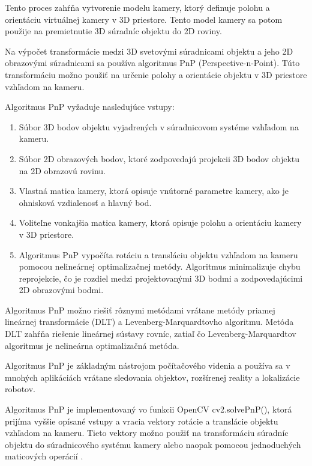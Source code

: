 {Tento proces zahŕňa vytvorenie modelu kamery, ktorý definuje polohu a orientáciu virtuálnej kamery v 3D priestore. Tento model kamery sa potom použije na premietnutie 3D súradníc objektu do 2D roviny.

Na výpočet transformácie medzi 3D svetovými súradnicami objektu a jeho 2D obrazovými súradnicami sa používa algoritmus PnP (Perspective-n-Point). Túto transformáciu možno použiť na určenie polohy a orientácie objektu v 3D priestore vzhľadom na kameru.

Algoritmus PnP vyžaduje nasledujúce vstupy:
\begin{enumerate}
\item Súbor 3D bodov objektu vyjadrených v súradnicovom systéme vzhľadom na kameru.
\item Súbor 2D obrazových bodov, ktoré zodpovedajú projekcii 3D bodov objektu na 2D obrazovú rovinu.
\item Vlastná matica kamery, ktorá opisuje vnútorné parametre kamery, ako je ohnisková vzdialenosť a hlavný bod.
\item Voliteľne vonkajšia matica kamery, ktorá opisuje polohu a orientáciu kamery v 3D priestore.
\item Algoritmus PnP vypočíta rotáciu a transláciu objektu vzhľadom na kameru pomocou nelineárnej optimalizačnej metódy. Algoritmus minimalizuje chybu reprojekcie, čo je rozdiel medzi projektovanými 3D bodmi a zodpovedajúcimi 2D obrazovými bodmi.
\end{enumerate}

Algoritmus PnP možno riešiť rôznymi metódami vrátane metódy priamej lineárnej transformácie (DLT) a Levenberg-Marquardtovho algoritmu. Metóda DLT zahŕňa riešenie lineárnej sústavy rovníc, zatiaľ čo Levenberg-Marquardtov algoritmus je nelineárna optimalizačná metóda.

Algoritmus PnP je základným nástrojom počítačového videnia a používa sa v mnohých aplikáciách vrátane sledovania objektov, rozšírenej reality a lokalizácie robotov.

Algoritmus PnP je implementovaný vo funkcii OpenCV cv2.solvePnP(), ktorá prijíma vyššie opísané vstupy a vracia vektory rotácie a translácie objektu vzhľadom na kameru. Tieto vektory možno použiť na transformáciu súradníc objektu do súradnicového systému kamery alebo naopak pomocou jednoduchých maticových operácií \citep{opencv_calib3d}.

}
